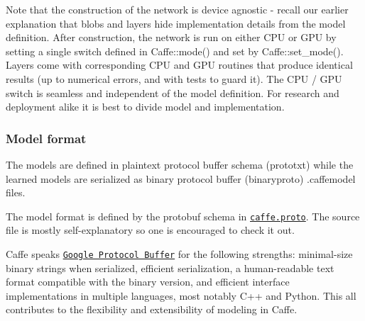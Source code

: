 Note that the construction of the network is device agnostic -\/ recall our earlier explanation that blobs and layers hide implementation details from the model definition. After construction, the network is run on either C\+PU or G\+PU by setting a single switch defined in {\ttfamily Caffe\+::mode()} and set by {\ttfamily Caffe\+::set\+\_\+mode()}. Layers come with corresponding C\+PU and G\+PU routines that produce identical results (up to numerical errors, and with tests to guard it). The C\+PU / G\+PU switch is seamless and independent of the model definition. For research and deployment alike it is best to divide model and implementation.

\subsubsection*{Model format}

The models are defined in plaintext protocol buffer schema (prototxt) while the learned models are serialized as binary protocol buffer (binaryproto) .caffemodel files.

The model format is defined by the protobuf schema in \href{https://github.com/BVLC/caffe/blob/master/src/caffe/proto/caffe.proto}{\tt caffe.\+proto}. The source file is mostly self-\/explanatory so one is encouraged to check it out.

Caffe speaks \href{https://code.google.com/p/protobuf/}{\tt Google Protocol Buffer} for the following strengths\+: minimal-\/size binary strings when serialized, efficient serialization, a human-\/readable text format compatible with the binary version, and efficient interface implementations in multiple languages, most notably C++ and Python. This all contributes to the flexibility and extensibility of modeling in Caffe. 